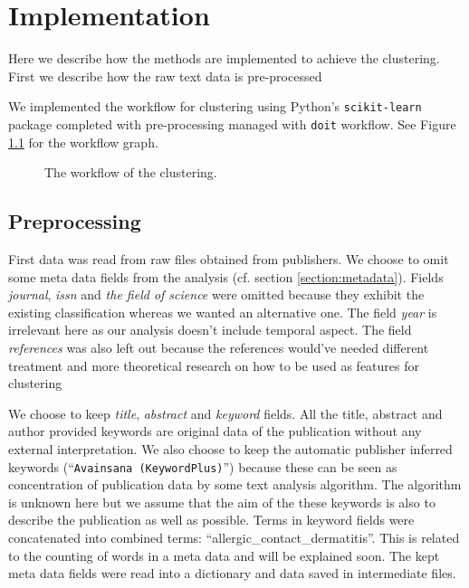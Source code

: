 \chapter{Implementation}
\label{chapter:implementation}


Here we describe how the methods are implemented to achieve the 
clustering. First we describe how the raw text data is 
pre-processed 

We implemented the workflow for clustering using Python's 
\texttt{scikit-learn} package completed with 
pre-processing managed with \texttt{doit} workflow. See Figure 
\ref{fig:wf} for the workflow graph.

\begin{figure}[ht]
  \begin{center}    
    
    \caption{The workflow of the clustering.}
    \label{fig:wf}
  \end{center}
\end{figure}

\section{Preprocessing}
\label{sec:impl_preproc}
First data was read from raw files obtained from publishers. 
We choose to omit some meta data fields from the analysis (cf. 
section \ref{section:metadata}). Fields \emph{journal}, 
\emph{issn} and \emph{the field of science} were omitted because 
they exhibit the existing classification whereas we wanted an 
alternative one. The field \emph{year} is irrelevant here as our 
analysis doesn't include temporal aspect. The field 
\emph{references} was also left out because the references 
would've needed different treatment and more theoretical research 
on how to be used as features for clustering 

We choose to keep \emph{title}, \emph{abstract} and 
\emph{keyword} fields. All the title, abstract and author 
provided keywords are original data of the publication without 
any external interpretation. We also choose to keep the automatic 
publisher inferred keywords (``\texttt{Avainsana 
(KeywordPlus)}'') because these can be seen as concentration of 
publication data by some text analysis algorithm. The algorithm is 
unknown here but we assume that the aim of the these keywords is 
also to describe the publication as well as possible. 
Terms in keyword fields were concatenated into combined terms: 
``allergic\_contact\_dermatitis''. This is related to the counting 
of words in a meta data and will be explained soon. The kept 
meta data fields were read into a dictionary and data saved in 
intermediate files.

